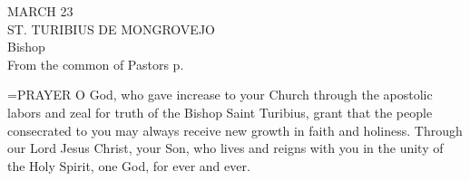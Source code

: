 \begin{center}\normalsize MARCH 23\\
\footnotesize ST. TURIBIUS DE MONGROVEJO\\
\footnotesize Bishop\\
\footnotesize From the common of Pastors p. \\
\end{center}

\hangindent=\parindent \small{PRAYER 
O God, who gave increase to your Church
through the apostolic labors and zeal for truth
of the Bishop Saint Turibius,
grant that the people consecrated to you
may always receive new growth in faith and holiness.
Through our Lord Jesus Christ, your Son,
who lives and reigns with you in the unity of the Holy Spirit,
one God, for ever and ever.\\}
 
